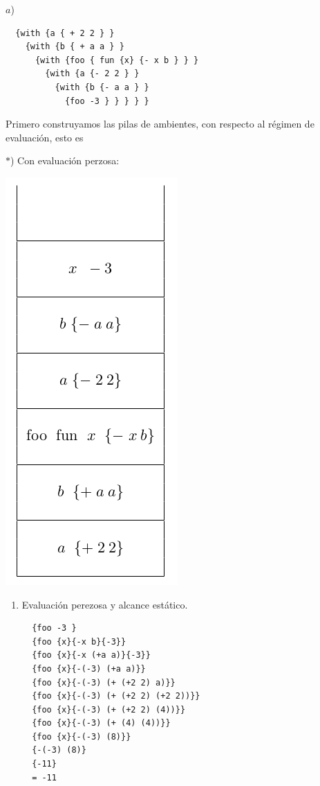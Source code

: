 $a$) \begin{lstlisting}
  {with {a { + 2 2 } }
    {with {b { + a a } }
      {with {foo { fun {x} {- x b } } }
        {with {a {- 2 2 } }
          {with {b {- a a } }
            {foo -3 } } } } }
\end{lstlisting}

Primero construyamos las pilas de ambientes, con
respecto al régimen de evaluación, esto es

\begin{multicols}{2}
  $*$) Con evaluación perzosa:
  \begin{center}
    \includegraphics[scale=0.52]{./Perezosa}
  \end{center}

  \begin{enumerate}
  \item Evaluación perezosa y alcance estático.
  \begin{lstlisting}
  {foo -3 }
  {foo {x}{-x b}{-3}}
  {foo {x}{-x (+a a)}{-3}}
  {foo {x}{-(-3) (+a a)}}
  {foo {x}{-(-3) (+ (+2 2) a)}}
  {foo {x}{-(-3) (+ (+2 2) (+2 2))}}
  {foo {x}{-(-3) (+ (+2 2) (4))}}
  {foo {x}{-(-3) (+ (4) (4))}}
  {foo {x}{-(-3) (8)}}
  {-(-3) (8)}
  {-11}
  = -11


\end{lstlisting}
\end{enumerate}
\end{multicols}

